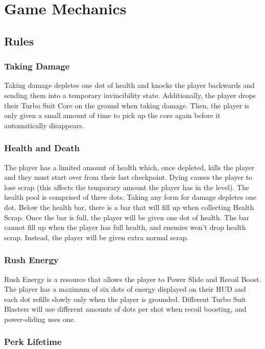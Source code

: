 \documentclass[12pt]{article}
\begin{document}
\section{Game Mechanics}

\subsection{Rules}

\subsubsection{Taking Damage}

Taking damage depletes one dot of health and knocks the player backwards and sending them into a temporary invincibility state. Additionally, the player drops their Turbo Suit Core on the ground when taking damage. Then, the player is only given a small amount of time to pick up the core again before it automatically disappears. 

\subsubsection{Health and Death}

The player has a limited amount of health which, once depleted, kills the player and they must start over from their last checkpoint. Dying causes the player to lose scrap (this affects the temporary amount the player has in the level). The health pool is comprised of three dots. Taking any form for damage depletes one dot. Below the health bar, there is a bar that will fill up when collecting Health Scrap. Once the bar is full, the player will be given one dot of health. The bar cannot fill up when the player has full health, and enemies won't drop health scrap. Instead, the player will be given extra normal scrap. 

\subsubsection{Rush Energy}

Rush Energy is a resource that allows the player to Power Slide and Recoil Boost. The player has a maximum of six dots of energy displayed on their HUD and each dot refills slowly only when the player is grounded. Different Turbo Suit Blasters will use different amounts of dots per shot when recoil boosting, and power-sliding uses one.

\subsubsection{Perk Lifetime}
\end{document}
